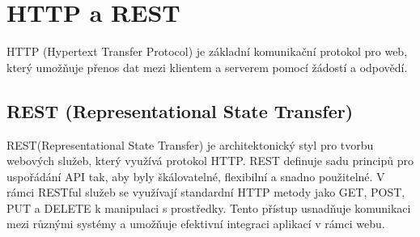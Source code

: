 \section*{HTTP a REST}\label{sec:http-rest}
HTTP (Hypertext Transfer Protocol) je základní komunikační protokol pro web, který umožňuje přenos dat mezi klientem a serverem pomocí žádostí a odpovědí.

\subsection*{REST (Representational State Transfer)}
REST(Representational State Transfer) je architektonický styl pro tvorbu webových služeb, který využívá protokol HTTP. REST definuje sadu principů pro uspořádání API tak, aby byly škálovatelné, flexibilní a snadno použitelné. V rámci RESTful služeb se využívají standardní HTTP metody jako GET, POST, PUT a DELETE k manipulaci s prostředky. Tento přístup usnadňuje komunikaci mezi různými systémy a umožňuje efektivní integraci aplikací v rámci webu.